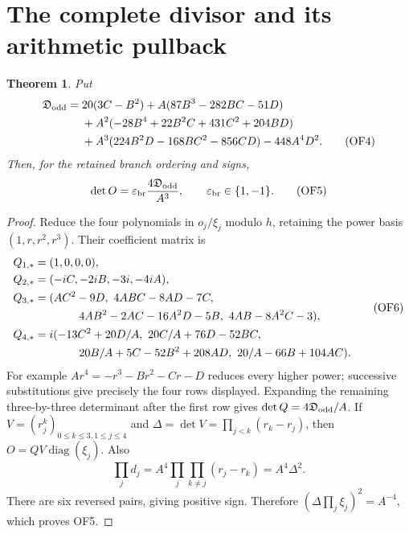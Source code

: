\documentclass[11pt]{article}
\newtheorem{theorem}{Theorem}
\newcommand{\dd}{\mathfrak D_{\rm odd}}
\newcommand{\diag}{\operatorname{diag}}
\begin{document}
\section{The complete divisor and its arithmetic pullback}
\begin{theorem}
Put
\begin{align}
 \dd={}&20(3C-B^2)+A(87B^3-282BC-51D)\notag\\
 &+A^2(-28B^4+22B^2C+431C^2+204BD)\notag\\
 &+A^3(224B^2D-168BC^2-856CD)-448A^4D^2.
 \tag{OF4}
\end{align}
Then, for the retained branch ordering and signs,
\begin{equation}
 \det O=\varepsilon_{\rm br}\frac{4\dd}{A^3},\qquad
 \varepsilon_{\rm br}\in\{1,-1\}.\tag{OF5}
\end{equation}
\end{theorem}
\begin{proof}
Reduce the four polynomials in $o_j/\xi_j$ modulo $h$, retaining
the power basis $(1,r,r^2,r^3)$. Their coefficient matrix is
\begin{equation}
 \begin{aligned}
 Q_{1,*}&=(1,0,0,0),\\
 Q_{2,*}&=(-iC,-2iB,-3i,-4iA),\\
 Q_{3,*}&=(AC^2-9D,\ 4ABC-8AD-7C,\\
 &\hspace{14mm}4AB^2-2AC-16A^2D-5B,\ 4AB-8A^2C-3),\\
 Q_{4,*}&=i(-13C^2+20D/A,\ 20C/A+76D-52BC,\\
 &\hspace{14mm}20B/A+5C-52B^2+208AD,\ 20/A-66B+104AC).
 \end{aligned}\tag{OF6}
\end{equation}
For example $Ar^4=-r^3-Br^2-Cr-D$ reduces every higher power;
successive substitutions give precisely the four rows displayed.
Expanding the remaining three-by-three determinant after the first
row gives $\det Q=4\dd/A$. If
$V=(r_j^{k})_{0\le k\le3,1\le j\le4}$ and
$\Delta=\det V=\prod_{j<k}(r_k-r_j)$, then
$O=QV\diag(\xi_j)$. Also
\[
 \prod_jd_j=A^4\prod_j\prod_{k\ne j}(r_j-r_k)
 =A^4\Delta^2.
\]
There are six reversed pairs, giving positive sign. Therefore
$(\Delta\prod_j\xi_j)^2=A^{-4}$, which proves OF5.
\end{proof}
\end{document}
